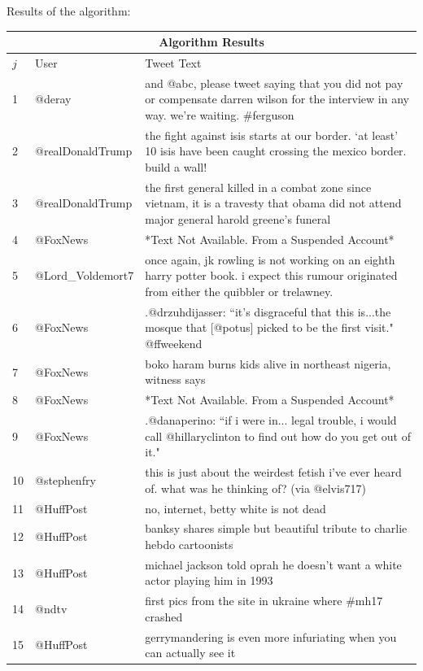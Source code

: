 \documentclass[preprint,review,12pt]{elsarticle}
\begin{document}
Results of the algorithm:
\begin{longtable}{ |p{0.5cm}|p{4.1cm}|p{12cm}|  }
\hline
\multicolumn{3}{|c|}{Algorithm Results} \\
\hline
$j$ & User & Tweet Text \\
\hline
1 & @deray & and @abc, please tweet saying that you did not pay or compensate darren wilson for the interview in any way. we're waiting. \#ferguson\\
\hline
2 & @realDonaldTrump & the fight against isis starts at our border. ‘at least’ 10 isis have been caught crossing the mexico border. build a wall!\\
\hline
3 & @realDonaldTrump & the first general killed in a combat zone since vietnam, it is a travesty that obama did not attend major general harold greene’s funeral\\
\hline
4 & @FoxNews & *Text Not Available. From a Suspended Account*\\
\hline
5 & @Lord\_Voldemort7 & once again, jk rowling is not working on an eighth harry potter book. i expect this rumour originated from either the quibbler or trelawney. \\
\hline
6 & @FoxNews & .@drzuhdijasser: ``it's disgraceful that this is...the mosque that [@potus] picked to be the first visit." @ffweekend \\
\hline
7 & @FoxNews & boko haram burns kids alive in northeast nigeria, witness says \\
\hline
8 & @FoxNews & *Text Not Available. From a Suspended Account* \\
\hline
9 & @FoxNews & .@danaperino: ``if i were in... legal trouble, i would call @hillaryclinton to find out how do you get out of it." \\
\hline
10 & @stephenfry & this is just about the weirdest fetish i've ever heard of. what was he thinking of? (via @elvis717) \\
\hline
11 & @HuffPost & no, internet, betty white is not dead \\
\hline
12 & @HuffPost & banksy shares simple but beautiful tribute to charlie hebdo cartoonists \\
\hline
13 & @HuffPost & michael jackson told oprah he doesn't want a white actor playing him in 1993\\
\hline
14 & @ndtv & first pics from the site in ukraine where \#mh17 crashed\\
\hline
15 & @HuffPost & gerrymandering is even more infuriating when you can actually see it \\

\end{longtable}
\end{document}
